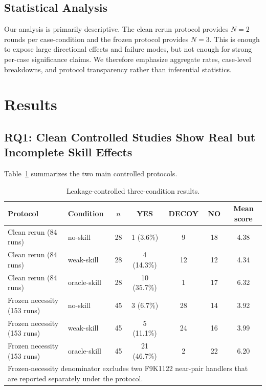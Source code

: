﻿\documentclass[preprint,12pt]{elsarticle}
\begin{document}
\subsection{Statistical Analysis}

Our analysis is primarily descriptive.  The clean rerun protocol provides
$N=2$ rounds per case-condition and the frozen protocol provides $N=3$.
This is enough to expose large directional effects and failure modes, but
not enough for strong per-case significance claims.  We therefore emphasize
aggregate rates, case-level breakdowns, and protocol transparency rather
than inferential statistics.

\section{Results}
\label{sec:results}

\subsection{RQ1: Clean Controlled Studies Show Real but Incomplete Skill Effects}
\label{sec:results_rq1}

Table~\ref{tab:clean_frozen_results} summarizes the two main controlled
protocols.

\begin{table}[t]
\centering
\caption{Leakage-controlled three-condition results.}
\label{tab:clean_frozen_results}
\footnotesize
\begin{tabular}{l l c c c c c}
\toprule
Protocol & Condition & $n$ & YES & DECOY & NO & Mean score \\
\midrule
Clean rerun (84 runs) & no-skill & 28 & 1 (3.6\%) & 9 & 18 & 4.38 \\
Clean rerun (84 runs) & weak-skill & 28 & 4 (14.3\%) & 12 & 12 & 4.34 \\
Clean rerun (84 runs) & oracle-skill & 28 & 10 (35.7\%) & 1 & 17 & 6.32 \\
\midrule
Frozen necessity (153 runs) & no-skill & 45 & 3 (6.7\%) & 28 & 14 & 3.92 \\
Frozen necessity (153 runs) & weak-skill & 45 & 5 (11.1\%) & 24 & 16 & 3.99 \\
Frozen necessity (153 runs) & oracle-skill & 45 & 21 (46.7\%) & 2 & 22 & 6.20 \\
\midrule
\multicolumn{7}{p{0.94\linewidth}}{\footnotesize Frozen-necessity denominator excludes two F9K1122 near-pair handlers that are reported separately under the protocol.} \\
\bottomrule
\end{tabular}
\end{table}
\end{document}
